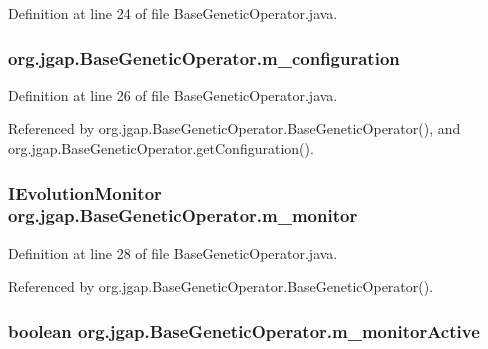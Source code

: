 Definition at line 24 of file Base\-Genetic\-Operator.\-java.

\hypertarget{classorg_1_1jgap_1_1_base_genetic_operator_ad085c4f27e1cc7b3a3cff5fec3b5f5de}{
\subsubsection[{m\-\_\-configuration}]{ org.\-jgap.\-Base\-Genetic\-Operator.\-m\-\_\-configuration\hspace{0.3cm}{\ttfamily [private]}}}\label{classorg_1_1jgap_1_1_base_genetic_operator_ad085c4f27e1cc7b3a3cff5fec3b5f5de}


Definition at line 26 of file Base\-Genetic\-Operator.\-java.



Referenced by org.\-jgap.\-Base\-Genetic\-Operator.\-Base\-Genetic\-Operator(), and org.\-jgap.\-Base\-Genetic\-Operator.\-get\-Configuration().

\hypertarget{classorg_1_1jgap_1_1_base_genetic_operator_a516d89e8f56eb2e58768218c7f9cf3de}{
\subsubsection[{m\-\_\-monitor}]{\setlength{\rightskip}{0pt plus 5cm}I\-Evolution\-Monitor org.\-jgap.\-Base\-Genetic\-Operator.\-m\-\_\-monitor\hspace{0.3cm}{\ttfamily [protected]}}}\label{classorg_1_1jgap_1_1_base_genetic_operator_a516d89e8f56eb2e58768218c7f9cf3de}


Definition at line 28 of file Base\-Genetic\-Operator.\-java.



Referenced by org.\-jgap.\-Base\-Genetic\-Operator.\-Base\-Genetic\-Operator().

\hypertarget{classorg_1_1jgap_1_1_base_genetic_operator_a5194e705ed206f99852bf158546646b5}{
\subsubsection[{m\-\_\-monitor\-Active}]{\setlength{\rightskip}{0pt plus 5cm}boolean org.\-jgap.\-Base\-Genetic\-Operator.\-m\-\_\-monitor\-Active\hspace{0.3cm}{\ttfamily [protected]}}}\label{classorg_1_1jgap_1_1_base_genetic_operator_a5194e705ed206f99852bf158546646b5}


